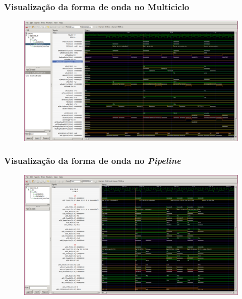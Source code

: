 \documentclass[aspectratio=169]{beamer}
\begin{document}
    \begin{frame}
        \frametitle{Visualização da forma de onda no Multiciclo}
        \vfill
        \begin{figure}[H]
        \centering
            \includegraphics[width=.95\textwidth,height=.85\textheight,keepaspectratio]
            {../images/gtkwave/gtkwave_multi.png}
        \end{figure}
        \vfill
    \end{frame}

    \begin{frame}
        \frametitle{Visualização da forma de onda no \textit{Pipeline}}
        \vfill
        \begin{figure}[H]
        \centering
            \includegraphics[width=.95\textwidth,height=.85\textheight,keepaspectratio]
            {../images/gtkwave/gtkwave_pipe.png}
        \end{figure}
        \vfill
    \end{frame}
\end{document}
